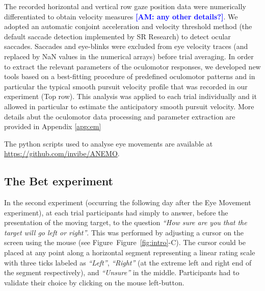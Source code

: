\documentclass[12pt,english]{article}%
\newcommand{\seeFig}[1]{Figure~\ref{fig:#1}}
\newcommand{\AM}[1]{\textbf{\textcolor{blue}{[AM: #1]}}}
\begin{document}
The recorded horizontal and vertical row gaze position data were numerically differentiated to obtain velocity measures \AM{any other details?}. We adopted an automatic conjoint acceleration and velocity threshold method (the default saccade detection implemented by SR Research) to detect ocular saccades. Saccades and eye-blinks were excluded from eye velocity traces (and replaced by NaN values in the numerical arrays) before trial averaging. 
In order to extract the relevant parameters of the oculomotor responses, we developed new tools based on a best-fitting procedure of predefined oculomotor patterns and in particular the typical smooth pursuit velocity profile that was recorded in our experiment (Top row). This analysis was applied to each trial individually and it allowed in particular to estimate the anticipatory smooth pursuit velocity. More details abut the oculomotor data processing and parameter extraction are provided in Appendix \ref{app:em} 

The python scripts used to analyse eye movements are available at \url{https://github.com/invibe/ANEMO}.

\subsection{The Bet experiment}
In the second experiment (occurring the following day after the Eye Movement experiment), at each trial participants had simply to answer, before the presentation of the moving target, to the question \textit{ ``How sure are you that the target will go left or right''}. This was performed by adjusting a cursor on the screen using the mouse (see Figure~\seeFig{intro}-C). The cursor could be placed at any point along a horizontal segment representing a linear rating scale with three ticks labeled as \textit{ ``Left''}, \textit{``Right''} (at the extreme left and right end of the segment respectively), and \textit{``Unsure''} in the middle. Participants had to validate their choice by clicking on the mouse left-button. 






\end{document}
